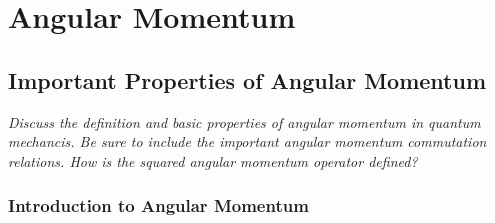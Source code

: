 \documentclass[11pt, a4paper]{article}
\begin{document}
\newpage
\section{Angular Momentum}

\subsection{Important Properties of Angular Momentum}
\textit{Discuss the definition and basic properties of angular momentum in quantum mechancis. Be sure to include the important angular momentum commutation relations. How is the squared angular momentum operator defined?}
\subsubsection{Introduction to Angular Momentum}
\end{document}
